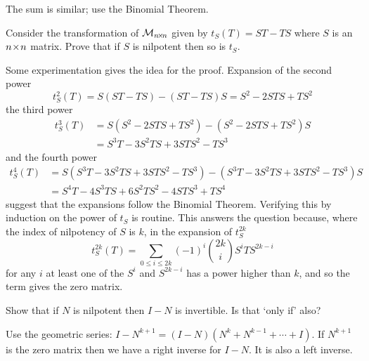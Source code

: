 \begin{exercises}
\begin{answer}
      The sum is similar; use the Binomial Theorem.  
     \end{answer}
  \item 
    Consider the transformation of \( \mathcal{M}_{n \! \times \! n} \) given
    by \( t_S(T)=ST-TS \) where \( S \) is an \( n \! \times \! n \) matrix.
    Prove that if \( S \) is nilpotent then so is \( t_S \).
    \begin{answer}
      Some experimentation gives the idea for the proof.
      Expansion of the second power
      \begin{equation*}
        t^2_S(T)=S(ST-TS)-(ST-TS)S=S^2-2STS+TS^2
      \end{equation*}
      the third power
      \begin{align*}
        t^3_S(T)
          &=S(S^2-2STS+TS^2)-(S^2-2STS+TS^2)S  \\
          &=S^3T-3S^2TS+3STS^2-TS^3
      \end{align*}
      and the fourth power
      \begin{align*}
        t^4_S(T)
          &=S(S^3T-3S^2TS+3STS^2-TS^3)-(S^3T-3S^2TS+3STS^2-TS^3)S  \\
          &=S^4T-4S^3TS+6S^2TS^2-4STS^3+TS^4
      \end{align*}
      suggest that the expansions follow the Binomial Theorem.
      Verifying this by induction on the power of $t_S$ is routine.
      This answers the question because, where the index of nilpotency of 
      $S$ is $k$, in the expansion of $t^{2k}_S$  
      \begin{equation*}
        t^{2k}_S(T)=\sum_{0\leq i\leq 2k}(-1)^i\binom{2k}{i} S^iTS^{2k-i}
      \end{equation*}
      for any $i$ at least one of the $S^i$ and $S^{2k-i}$ 
      has a power higher than $k$, and so the term gives the zero matrix. 
    \end{answer}
  \item 
    Show that if \( N \) is nilpotent then \( I-N \) is
    invertible.
    Is that `only if' also?
    \begin{answer}
      Use the geometric series:
      $
         I-N^{k+1}=(I-N)(N^k+N^{k-1}+\cdots+I)
      $.
      If \( N^{k+1} \) is the zero matrix then we have a right inverse for
      \( I-N \).
      It is also a left inverse.


\end{answer}
\end{exercises}
